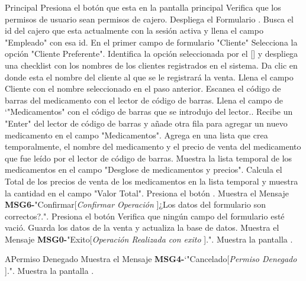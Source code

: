 	\begin{UCtrayectoria}{Principal}
		\UCpaso [\UCactor] Presiona el botón  que esta en la pantalla principal 
		\UCpaso Verifica que los permisos de usuario sean permisos de cajero. 
		\UCpaso Despliega el Formulario .
		\UCpaso Busca el id del cajero que esta actualmente con la sesión activa y llena el campo "Empleado" con esa id.
		\UCpaso [\UCactor] En el primer campo de formulario "Cliente" Selecciona la opción "Cliente Preferente".
		\UCpaso Identifica la opción seleccionada por el [\UCactor] y despliega una checklist con los nombres de los clientes registrados en el sistema.
		\UCpaso [\UCactor] Da clic en donde esta el nombre del cliente al que se le registrará la venta.
		\UCpaso Llena el campo Cliente con el nombre seleccionado en el paso anterior. 
		\UCpaso [\UCactor] Escanea el código de barras del medicamento con el lector de código de barras.
		\UCpaso Llena el campo de `"Medicamentos" con el código de barras que se introdujo del lector..
		\UCpaso Recibe un "Enter" del lector de código de barras y añade otra fila para agregar un nuevo medicamento en el campo "Medicamentos".
		\UCpaso Agrega en una lista que crea temporalmente, el nombre del  medicamento y el precio de venta del medicamento que fue leído por el lector de código de barras.
		\UCpaso Muestra la lista temporal de los medicamentos en el campo "Desglose de medicamentos y precios".
		\UCpaso Calcula el Total de los precios de venta de los medicamentos en la lista temporal y muestra la cantidad en el campo "Valor Total".
		\UCpaso [\UCactor] Presiona el botón .
		\UCpaso Muestra el Mensaje {\bf MSG6-}"Confirmar[{\em Confirmar Operación }]¿Los datos del formulario son correctos?.".
		\UCpaso [\UCactor] Presiona el botón 
		\UCpaso Verifica que ningún campo del formulario esté vació. 
		\UCpaso Guarda los datos de la venta y actualiza la base de datos.
		\UCpaso Muestra el Mensaje {\bf MSG0-}"Exito[{\em Operación Realizada con exito }].".
		\UCpaso Muestra la pantalla .
	\end{UCtrayectoria}

	\begin{UCtrayectoriaA}{A}{Permiso Denegado}
			\UCpaso Muestra el Mensaje {\bf MSG4-}`"Cancelado[{\em Permiso Denegado }].".
			\UCpaso Muestra la pantalla .
		\end{UCtrayectoriaA}

